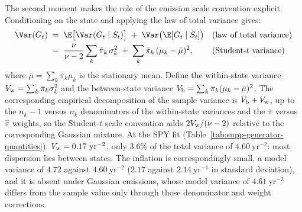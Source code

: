 The second moment makes the role of the emission scale convention
explicit. Conditioning on the state and applying the law of total
variance gives:
\begin{align}
  \Var(G_t)
   &\;=\; \E\big[\Var(G_t \mid S_t)\big]
     \;+\; \Var\big(\E[G_t \mid S_t]\big)
     && \text{(law of total variance)} \notag \\
   &\;=\; \frac{\nu}{\nu - 2} \sum_k \bar\pi_k\, \sigma_k^2
     \;+\; \sum_k \bar\pi_k\, (\mu_k - \bar\mu)^2,
     && \text{(Student-$t$ variance)}
  \label{eq:supp-variance}
\end{align}
where $\bar\mu = \sum_k \bar\pi_k \mu_k$ is the stationary mean.
Define the within-state variance $V_{\rm w} = \sum_k \bar\pi_k
\sigma_k^2$ and the between-state variance $V_{\rm b} = \sum_k
\bar\pi_k (\mu_k - \bar\mu)^2$. The corresponding empirical
decomposition of the sample variance is $V_{\rm b} + V_{\rm w}$, up to
the $n_k - 1$ versus $n_k$ denominators of the within-state variances
and the $\bar\pi$ versus $\hat\pi$ weights, so the Student-$t$ scale convention adds
$2 V_{\rm w} / (\nu - 2)$ relative to the corresponding Gaussian mixture. At the SPY fit
(Table~\ref{tab:supp-generator-quantities}),
$V_{\rm w} = 0.17~\mathrm{yr}^{-2}$, only $3.6\%$ of the total
variance of $4.60~\mathrm{yr}^{-2}$: most dispersion lies between states. The inflation is correspondingly small, a model variance of
$4.72$ against $4.60~\mathrm{yr}^{-2}$ ($2.17$ against
$2.14~\mathrm{yr}^{-1}$ in standard deviation), and it is absent under
Gaussian emissions, whose model variance of $4.61~\mathrm{yr}^{-2}$
differs from the sample value only through those denominator and
weight corrections.

